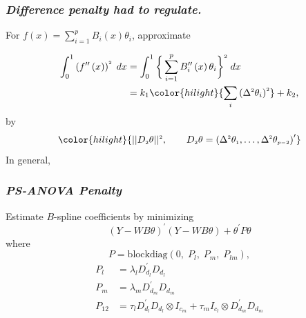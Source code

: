 \documentclass[12pt]{beamer}
\newcommand{\newthought}[1]{{\small \color{hilight} {#1}}}
\newcommand{\newmaththought}[1]{{ \color{hilight} {#1}}}
\newcommand{\ms}{\scriptscriptstyle}
\begin{document}
\begin{frame}
\frametitle{\emph{Difference penalty had to regulate.}}

For $f\left(x\right)=\sum \limits_{i=1}^{p} B_{i}\left(x\right) \theta_{i}$, approximate

\begin{align}
\begin{split}
\int_0^1 \left(f^{\prime \prime}\left(x\right)\right)^{\ms 2} \;dx &= \int_0^1 \bigg\{ \sum \limits_{i=1}^{p} B^{\prime \prime}_{i}\left(x\right) \theta_{i} \bigg\}^{\ms 2} \;dx \\ 
&= k_1 \newmaththought{\sum_i \left( \Delta^{\ms 2} \theta_i \right)^{\ms 2}} + k_2, 
\end{split}
\end{align}
\noindent
by
\[
\newmaththought{\vert \vert D_{\ms 2} \theta \vert \vert^{\ms 2}, \qquad  D_{\ms 2} \theta= \left( \Delta^{\ms 2}\theta_{\ms 1},\dots,\Delta^{\ms 2}\theta_{\ms{p-2}} \right)^\prime }
\]
In general, 
\framebox{\newthought{approximate} $\newmaththought{\int \limits_{\ms 0}^{\ms 1} \big(f^{\ms{\left(d\right)}}\big)^{\ms 2}\;dx}$ \newthought{with} $\newmaththought{\vert \vert D_{\ms d} \theta \vert \vert^{\ms 2} }$ }
\end{frame}


\begin{frame}
\frametitle{\emph{PS-ANOVA Penalty}}

Estimate $B$-spline coefficients by minimizing 
\begin{equation*}
\left(Y-WB\theta\right)^\prime \left(Y-WB\theta\right) + \theta^\prime P \theta
\end{equation*}
\noindent
where
\begin{equation} \label{eq:PSANOVA-penalty}
P = \mbox{blockdiag}\left(0,\; P_l, \; P_m, \; P_{lm}\right),
\end{equation}
\begin{align*}
P_{\ms l} &= \lambda_l D_{\ms{d_l}}^\prime D_{\ms{d_l}}\\
P_{\ms m} &= \lambda_m D_{\ms{d_m}}^\prime D_{\ms{d_m}}\\
P_{\ms{12}} &= \tau_l D_{\ms{d_l}}^\prime D_{\ms{d_l}} \otimes I_{\ms{c_m}} + \tau_m I_{\ms{c_l}} \otimes D_{\ms{d_m}}^\prime D_{\ms{d_m}} 
\end{align*}


\end{frame}
\end{document}
